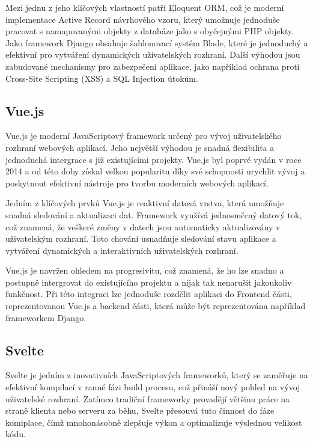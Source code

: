 Mezi jednu z jeho klíčových vlastností patří Eloquent ORM, což je moderní implementace Active Record návrhového vzoru, který umožnuje jednoduše pracovat s namapovanými objekty z databáze jako s obyčejnými PHP objekty. Jako framework Django obsahuje šablonovací systém Blade, které je jednoduchý a efektivní pro vytváření dynamických uživatelských rozhraní. Další výhodou jsou zabudované mechanismy pro zabezpečení aplikace, jako například ochrana proti Cross-Site Scripting (XSS) a SQL Injection útokům. \cite{about_laravel}

\subsection{Vue.js}
\label{subsec:dev-framework-vuejs}
Vue.js je moderní JavaScriptový framework určený pro vývoj uživatelského rozhraní webových aplikací. Jeho největší výhodou je snadná flexibilita a jednoduchá intergrace s již existujícími projekty. Vue.js byl poprvé vydán v roce 2014 a od této doby získal velkou popularitu díky své schopnosti urychlit vývoj a poskytnout efektivní nástroje pro tvorbu moderních webových aplikací.

Jedním z klíčových prvků Vue.js je reaktivní datová vrstva, která umožňuje snadná sledování a aktualizaci dat. Framework využívá jednosměrný datový tok, což znamená, že veškeré změny v datech jsou automaticky aktualizovány v uživatelským rozhraní. Toto chování usnadňuje sledování stavu aplikace a vytváření dynamických a interaktivních uživatelských rozhraní.

Vue.js je navržen ohledem na progresivitu, což znamená, že ho lze snadno a postupně intergrovat do existujícího projektu a nijak tak nenarušit jakoukoliv funkčnost. Při této integraci lze jednoduše rozdělit aplikaci do Frontend části, reprezentovanou Vue.js a backend části, která může být reprezentována například frameworkem Django. \cite{about_vuejs}

\subsection{Svelte}
\label{subsec:dev-framework-svelte}
Svelte je jedním z inovativních JavaScriptových frameworků, který se zaměřuje na efektivní kompilací v ranné fázi build procesu, což přináší nový pohled na vývoj uživatelské rozhraní. Zatímco tradiční frameworky provadějí většinu práce na straně klienta nebo serveru za běhu, Svelte přesouvá tuto činnost do fáze komiplace, čímž mnohonásobně zlepšuje výkon a optimalizuje výslednou velikost kódu.

